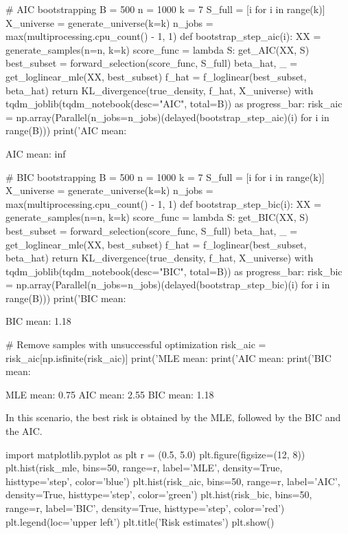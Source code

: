 \begin{python}
# AIC bootstrapping
B = 500
n = 1000
k = 7
S_full = [i for i in range(k)]
X_universe = generate_universe(k=k)
n_jobs = max(multiprocessing.cpu_count() - 1, 1)
def bootstrap_step_aic(i):
    XX = generate_samples(n=n, k=k)    
    score_func = lambda S: get_AIC(XX, S)
    best_subset = forward_selection(score_func, S_full)
    beta_hat, _ = get_loglinear_mle(XX, best_subset)
    f_hat = f_loglinear(best_subset, beta_hat)
    return KL_divergence(true_density, f_hat, X_universe)
with tqdm_joblib(tqdm_notebook(desc="AIC", total=B)) as progress_bar:
    risk_aic = np.array(Parallel(n_jobs=n_jobs)(delayed(bootstrap_step_aic)(i) for i in range(B)))
print('AIC mean: %
\end{python}
\begin{console}
AIC mean: inf
\end{console}

\begin{python}
# BIC bootstrapping
B = 500
n = 1000
k = 7
S_full = [i for i in range(k)]
X_universe = generate_universe(k=k)
n_jobs = max(multiprocessing.cpu_count() - 1, 1)
def bootstrap_step_bic(i):
    XX = generate_samples(n=n, k=k)    
    score_func = lambda S: get_BIC(XX, S)
    best_subset = forward_selection(score_func, S_full)
    beta_hat, _ = get_loglinear_mle(XX, best_subset)
    f_hat = f_loglinear(best_subset, beta_hat)
    return KL_divergence(true_density, f_hat, X_universe)
with tqdm_joblib(tqdm_notebook(desc="BIC", total=B)) as progress_bar:
    risk_bic = np.array(Parallel(n_jobs=n_jobs)(delayed(bootstrap_step_bic)(i) for i in range(B)))
print('BIC mean: %
\end{python}
\begin{console}
BIC mean: 1.18
\end{console}

\begin{python}
# Remove samples with unsuccessful optimization
risk_aic = risk_aic[np.isfinite(risk_aic)]
print('MLE mean: %
print('AIC mean: %
print('BIC mean: %
\end{python}
\begin{console}
MLE mean: 0.75
AIC mean: 2.55
BIC mean: 1.18
\end{console}
In this scenario, the best risk is obtained by the MLE, followed by the
BIC and the AIC.

\begin{python}
import matplotlib.pyplot as plt
r = (0.5, 5.0)
plt.figure(figsize=(12, 8))
plt.hist(risk_mle, bins=50, range=r, label='MLE', density=True, histtype='step', color='blue')
plt.hist(risk_aic, bins=50, range=r, label='AIC', density=True, histtype='step', color='green')
plt.hist(risk_bic, bins=50, range=r, label='BIC', density=True, histtype='step', color='red')
plt.legend(loc='upper left')
plt.title('Risk estimates')
plt.show()
\end{python}

